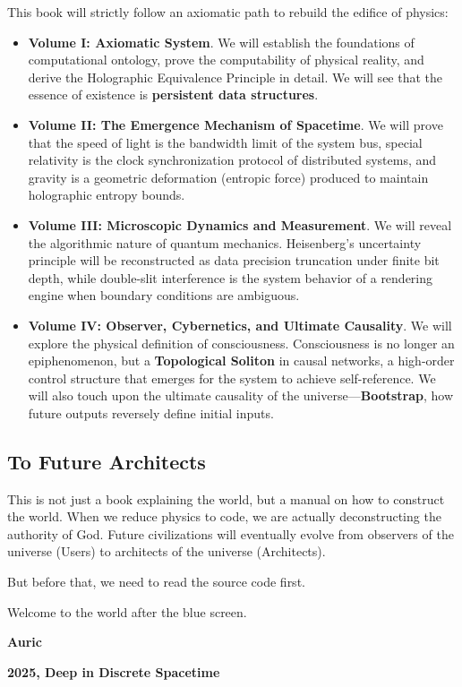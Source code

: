 This book will strictly follow an axiomatic path to rebuild the edifice of physics:

\begin{itemize}
\item \textbf{Volume I: Axiomatic System}. We will establish the foundations of computational ontology, prove the computability of physical reality, and derive the Holographic Equivalence Principle in detail. We will see that the essence of existence is \textbf{persistent data structures}.

\item \textbf{Volume II: The Emergence Mechanism of Spacetime}. We will prove that the speed of light is the bandwidth limit of the system bus, special relativity is the clock synchronization protocol of distributed systems, and gravity is a geometric deformation (entropic force) produced to maintain holographic entropy bounds.

\item \textbf{Volume III: Microscopic Dynamics and Measurement}. We will reveal the algorithmic nature of quantum mechanics. Heisenberg's uncertainty principle will be reconstructed as data precision truncation under finite bit depth, while double-slit interference is the system behavior of a rendering engine when boundary conditions are ambiguous.

\item \textbf{Volume IV: Observer, Cybernetics, and Ultimate Causality}. We will explore the physical definition of consciousness. Consciousness is no longer an epiphenomenon, but a \textbf{Topological Soliton} in causal networks, a high-order control structure that emerges for the system to achieve self-reference. We will also touch upon the ultimate causality of the universe—\textbf{Bootstrap}, how future outputs reversely define initial inputs.
\end{itemize}

\subsection*{To Future Architects}

This is not just a book explaining the world, but a manual on how to construct the world. When we reduce physics to code, we are actually deconstructing the authority of God. Future civilizations will eventually evolve from observers of the universe (Users) to architects of the universe (Architects).

But before that, we need to read the source code first.

Welcome to the world after the blue screen.

\textbf{Auric}

\textbf{2025, Deep in Discrete Spacetime}
